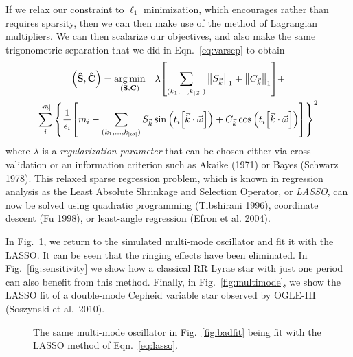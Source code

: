 \documentclass[11pt,twoside]{book}
\begin{document}
If we relax our constraint to $\ell_1$ minimization, which encourages rather than requires sparsity, then we can then make use of the method of Lagrangian multipliers. We can then scalarize our objectives, and also make the same trigonometric separation that we did in Eqn.~\ref{eq:varsep} to obtain
\begin{equation} \label{eq:lasso}
\begin{gathered}
    \qty(\mathbf {\hat S}, \mathbf{\hat C}) = \underset{(\mathbf S, \mathbf C)}{\arg\min} \quad \lambda \qty[ \sum_{(k_1, \dots, k_{|\vec{\omega}|})} \norm{S_{\vec{k}}}_1 + \norm{C_{\vec{k}}}_1 ] +
    \\\sum_i^{|\vec{m}|} \qty{\frac{1}{\epsilon_i}\qty[m_i - 
      \sum_{(k_1, \dots, k_{|\boldsymbol{\omega}|})} 
        S_{\vec{k}} \sin \qty(t_i\qty[\vec{k}\cdot\vec{\omega}]) 
       +C_{\vec{k}} \cos \qty(t_i\qty[\vec{k}\cdot\vec{\omega}])]
    }^2
\end{gathered}
\end{equation}
where $\lambda$ is a \emph{regularization parameter} that can be chosen either via cross-validation or an information criterion such as Akaike (1971) or Bayes (Schwarz 1978). This relaxed sparse regression problem, which is known in regression analysis as the Least Absolute Shrinkage and Selection Operator, or \emph{LASSO}, can now be solved using quadratic programming (Tibshirani 1996), coordinate descent (Fu 1998), or least-angle regression (Efron et al. 2004). 

In Fig.~\ref{fig:goodfit}, we return to the simulated multi-mode oscillator and fit it with the LASSO. It can be seen that the ringing effects have been eliminated. In Fig.~\ref{fig:sensitivity} we show how a classical RR Lyrae star with just one period can also benefit from this method. Finally, in Fig.~\ref{fig:multimode}, we show the LASSO fit of a double-mode Cepheid variable star observed by OGLE-III (Soszynski et al.~2010). 

\begin{figure}
    \centering
    
    \caption{The same multi-mode oscillator in Fig.~\ref{fig:badfit} being fit with the LASSO method of Eqn.~\ref{eq:lasso}.} 
    \label{fig:goodfit} 
\end{figure}
\end{document}
